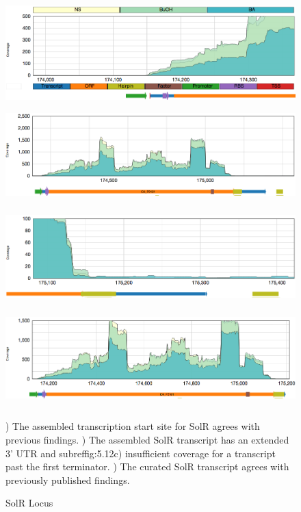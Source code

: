 \begin{figure}
{\includegraphics[width=\textwidth,height=1.5in]{images/Assembly/Examples/Sol/SolR-TSS.png}
\label{fig:5.12a}}
{\includegraphics[width=\textwidth,height=1.5in]{images/Assembly/Examples/Sol/SolR-transcript.png}
\label{fig:5.12b}}
{\includegraphics[width=\textwidth,height=1.5in]{images/Assembly/Examples/Sol/SolR-termination.png}
\label{fig:5.12c}}
{\includegraphics[width=\textwidth,height=1.5in]{images/Assembly/Examples/Sol/SolR-curated.png}
\label{fig:5.12d}}
\caption{SolR Locus}
) The assembled transcription start site for SolR agrees with previous findings. ) The assembled SolR transcript has an extended 3' UTR and subref{fig:5.12c}) insufficient coverage for a transcript past the first terminator. ) The curated SolR transcript agrees with previously published findings\cite{69}.
\end{figure}

